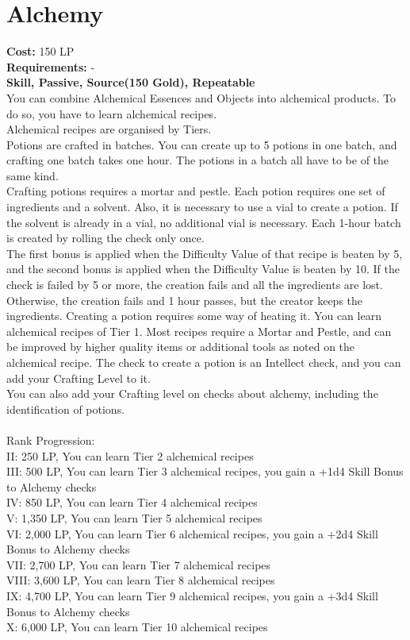 \section{Alchemy}\label{perk:alchemy}
\textbf{Cost:} 150 LP\\
\textbf{Requirements:} -\\
\textbf{Skill, Passive, Source(150 Gold), Repeatable}\\
You can combine Alchemical Essences and Objects into alchemical products.
To do so, you have to learn alchemical recipes.\\
Alchemical recipes are organised by Tiers.\\
Potions are crafted in batches.
You can create up to 5 potions in one batch, and crafting one batch takes one hour.
The potions in a batch all have to be of the same kind.\\
Crafting potions requires a mortar and pestle.
Each potion requires one set of ingredients and a solvent.
Also, it is necessary to use a vial to create a potion.
If the solvent is already in a vial, no additional vial is necessary.
Each 1-hour batch is created by rolling the check only once.\\
The first bonus is applied when the Difficulty Value of that recipe is beaten by 5, and the second bonus is applied when the Difficulty Value is beaten by 10.
If the check is failed by 5 or more, the creation fails and all the ingredients are lost.
Otherwise, the creation fails and 1 hour passes, but the creator keeps the ingredients.
Creating a potion requires some way of heating it.
You can learn alchemical recipes of Tier 1.
Most recipes require a Mortar and Pestle, and can be improved by higher quality items or additional tools as noted on the alchemical recipe.
The check to create a potion is an Intellect check, and you can add your Crafting Level to it.\\
You can also add your Crafting level on checks about alchemy, including the identification of potions.\\
\\
Rank Progression:\\
II: 250 LP, You can learn Tier 2 alchemical recipes\\
III: 500 LP, You can learn Tier 3 alchemical recipes, you gain a +1d4 Skill Bonus to Alchemy checks\\
IV: 850 LP, You can learn Tier 4 alchemical recipes\\
V: 1,350 LP, You can learn Tier 5 alchemical recipes\\
VI: 2,000 LP, You can learn Tier 6 alchemical recipes, you gain a +2d4 Skill Bonus to Alchemy checks\\
VII: 2,700 LP, You can learn Tier 7 alchemical recipes\\
VIII: 3,600 LP, You can learn Tier 8 alchemical recipes\\
IX: 4,700 LP, You can learn Tier 9 alchemical recipes, you gain a +3d4 Skill Bonus to Alchemy checks\\
X: 6,000 LP, You can learn Tier 10 alchemical recipes\\